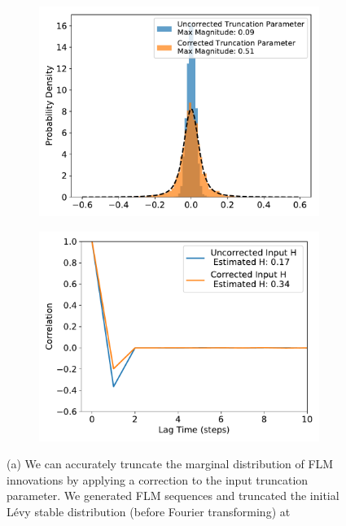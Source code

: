 \documentclass{article}
\begin{document}
  \begin{figure}
  \centering
  \begin{subfigure}{0.45\textwidth}
  \includegraphics[width=\textwidth]{truncation_correction.pdf}
  \caption{}\label{fig:truncation_correction}
  \end{subfigure}
  \begin{subfigure}{0.45\textwidth}
  \includegraphics[width=\textwidth]{hurst_correction.pdf}
  \caption{}\label{fig:hurst_correction}
  \end{subfigure}
  \caption{(a) We can accurately truncate the marginal distribution of FLM innovations by
  applying a correction to the input truncation parameter. We generated FLM sequences
  and truncated the initial L\'evy stable distribution (before Fourier transforming) at 
}
\end{figure}
\end{document}
